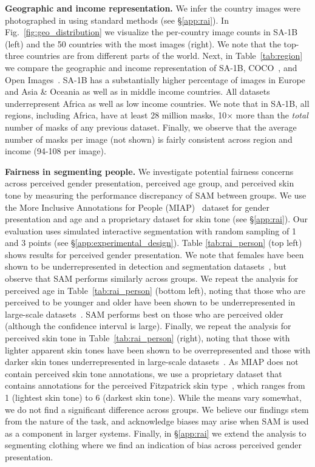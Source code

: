 \textbf{Geographic and income representation.} We infer the country images were photographed in using standard methods (see \S\ref{app:rai}). In Fig.~\ref{fig:geo_distribution} we visualize the per-country image counts in \mbox{SA-1B} (left) and the 50 countries with the most images (right). We note that the top-three countries are from different parts of the world. Next, in Table~\ref{tab:region} we compare the geographic and income representation of \mbox{SA-1B}, COCO~\cite{Lin2014}, and Open Images~\cite{OpenImages}. \mbox{SA-1B} has a substantially higher percentage of images in Europe and Asia \& Oceania as well as in middle income countries. All datasets underrepresent Africa as well as low income countries. We note that in \mbox{SA-1B}, all regions, including Africa, have at least 28 million masks, 10${\times}$ more than the \emph{total} number of masks of any previous dataset. Finally, we observe that the average number of masks per image (not shown) is fairly consistent across region and income (94-108 per image).

\textbf{Fairness in segmenting people.} We investigate potential fairness concerns across perceived gender presentation, perceived age group, and perceived skin tone by measuring the performance discrepancy of SAM between groups. We use the More Inclusive Annotations for People (MIAP)~\cite{schumann2021step} dataset for gender presentation and age and a proprietary dataset for skin tone (see \S\ref{app:rai}). Our evaluation uses simulated interactive segmentation with random sampling of 1 and 3 points (see \S\ref{app:experimental_design}). Table \ref{tab:rai_person} (top left) shows results for perceived gender presentation. We note that females have been shown to be underrepresented in detection and segmentation datasets~\cite{zhao2017}, but observe that SAM performs similarly across groups. We repeat the analysis for perceived age in Table~\ref{tab:rai_person} (bottom left), noting that those who are perceived to be younger and older have been shown to be underrepresented in large-scale datasets~\cite{yang2020towards}. SAM performs best on those who are perceived older (although the confidence interval is large). Finally, we repeat the analysis for perceived skin tone in Table~\ref{tab:rai_person} (right), noting that those with lighter apparent skin tones have been shown to be overrepresented and those with darker skin tones underrepresented in large-scale datasets~\cite{yang2020towards}. As MIAP does not contain perceived skin tone annotations, we use a proprietary dataset that contains annotations for the perceived Fitzpatrick skin type~\cite{fitzpatrick1988}, which ranges from 1 (lightest skin tone) to 6 (darkest skin tone). While the means vary somewhat, we do not find a significant difference across groups. We believe our findings stem from the nature of the task, and acknowledge biases may arise when SAM is used as a component in larger systems. Finally, in \S\ref{app:rai} we extend the analysis to segmenting clothing where we find an indication of bias across perceived gender presentation.

